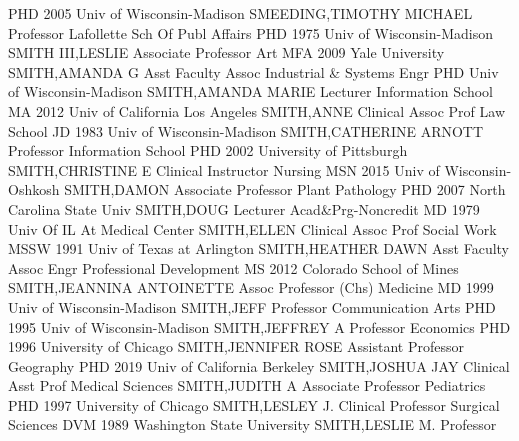 \documentclass[
]{article}
\begin{document}
 \textbar PHD 2005 Univ of Wisconsin-Madison
\textbar SMEEDING,TIMOTHY MICHAEL \textbar Professor \textbar Lafollette
Sch Of Publ Affairs \textbar{}  \textbar PHD 1975 Univ of
Wisconsin-Madison \textbar SMITH III,LESLIE \textbar Associate Professor
\textbar Art \textbar{}  \textbar MFA 2009 Yale University
\textbar SMITH,AMANDA G \textbar Asst Faculty Assoc \textbar Industrial
\& Systems Engr \textbar{}  \textbar PHD Univ of
Wisconsin-Madison \textbar SMITH,AMANDA MARIE \textbar Lecturer
\textbar Information School \textbar{}  \textbar MA 2012
Univ of California Los Angeles \textbar SMITH,ANNE \textbar Clinical
Assoc Prof \textbar Law School \textbar{}  \textbar JD 1983
Univ of Wisconsin-Madison \textbar SMITH,CATHERINE ARNOTT
\textbar Professor \textbar Information School \textbar{} 
\textbar PHD 2002 University of Pittsburgh \textbar SMITH,CHRISTINE E
\textbar Clinical Instructor \textbar Nursing \textbar{} 
\textbar MSN 2015 Univ of Wisconsin-Oshkosh \textbar SMITH,DAMON
\textbar Associate Professor \textbar Plant Pathology \textbar{}
 \textbar PHD 2007 North Carolina State Univ
\textbar SMITH,DOUG \textbar Lecturer \textbar Acad\&Prg-Noncredit
\textbar{}  \textbar MD 1979 Univ Of IL At Medical Center
\textbar SMITH,ELLEN \textbar Clinical Assoc Prof \textbar Social Work
\textbar{}  \textbar MSSW 1991 Univ of Texas at Arlington
\textbar SMITH,HEATHER DAWN \textbar Asst Faculty Assoc \textbar Engr
Professional Development \textbar{}  \textbar MS 2012
Colorado School of Mines \textbar SMITH,JEANNINA ANTOINETTE
\textbar Assoc Professor (Chs) \textbar Medicine \textbar{} 
\textbar MD 1999 Univ of Wisconsin-Madison \textbar SMITH,JEFF
\textbar Professor \textbar Communication Arts \textbar{} 
\textbar PHD 1995 Univ of Wisconsin-Madison \textbar SMITH,JEFFREY A
\textbar Professor \textbar Economics \textbar{} 
\textbar PHD 1996 University of Chicago \textbar SMITH,JENNIFER ROSE
\textbar Assistant Professor \textbar Geography \textbar{} 
\textbar PHD 2019 Univ of California Berkeley \textbar SMITH,JOSHUA JAY
\textbar Clinical Asst Prof \textbar Medical Sciences \textbar{}
 \textbar SMITH,JUDITH A \textbar Associate Professor
\textbar Pediatrics \textbar PHD 1997 University of Chicago \textbar{}
 \textbar SMITH,LESLEY J. \textbar Clinical Professor
\textbar Surgical Sciences \textbar DVM 1989 Washington State University
\textbar{}  \textbar SMITH,LESLIE M. \textbar Professor
\end{document}
